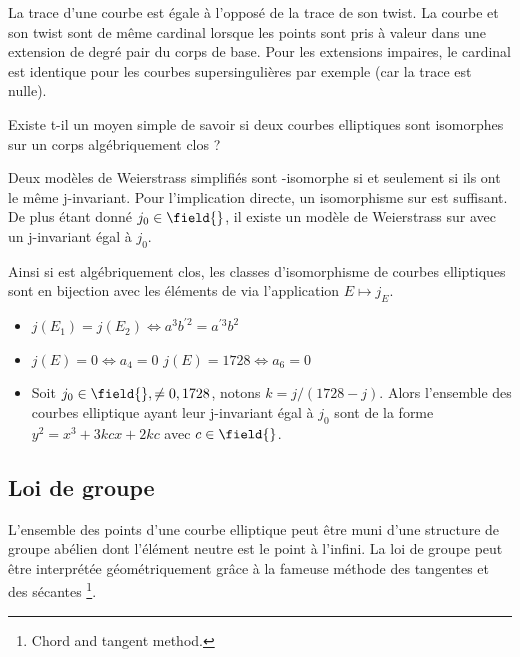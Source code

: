 La trace d'une courbe est égale à l'opposé de la trace de son twist. La courbe et son twist sont de même cardinal lorsque les points sont pris à valeur dans une extension de degré pair du corps de base. Pour les extensions impaires, le cardinal est identique pour les courbes supersingulières par exemple (car la trace est nulle).


Existe t-il un moyen simple de savoir si deux courbes elliptiques sont isomorphes sur un corps algébriquement clos ? 

\begin{propriete}
Deux modèles de Weierstrass simplifiés sont \closure{}-isomorphe si et seulement si ils ont le même j-invariant. Pour l'implication directe, un isomorphisme sur \field{} est suffisant. De plus étant donné $j_0 \in \field{}$, il existe un modèle de Weierstrass sur \field{} avec un j-invariant égal à $j_0$.

Ainsi si \field{} est algébriquement clos, les classes d'isomorphisme de courbes elliptiques sont en bijection avec les éléments de \field{} via l'application $E \mapsto j_E$.
\end{propriete}
\begin{itemize}[label=$\bullet$]
    \item $j(E_1) = j(E_2) \Longleftrightarrow a^3 b^{'2} = a^{'3}b^{2}$
    \item $j(E) = 0 \Longleftrightarrow a_4 = 0$ \hspace{1cm} $j(E) = 1728 \Longleftrightarrow a_6 = 0$
    \item Soit $j_0 \in \field{}, \neq 0, 1728$, notons $k = j / (1728 - j)$. Alors l'ensemble des courbes elliptique ayant leur j-invariant égal à $j_0$ sont de la forme $y^2 = x^3 + 3kcx + 2kc$ avec $c \in \field{}$. 
\end{itemize}


\subsection{Loi de groupe}
L'ensemble des points d'une courbe elliptique peut être muni d'une structure de groupe abélien dont l'élément neutre est le point à l'infini. La loi de groupe peut être interprétée géométriquement grâce à la fameuse méthode des tangentes et des sécantes \footnote{Chord and tangent method.}.

